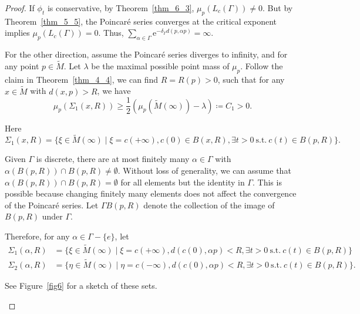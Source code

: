 \documentclass[reqno,11pt]{article}
\theoremstyle{definition}
\theoremstyle{remark}
\numberwithin{equation}{section}
\begin{document}
\begin{proof}
	If $\phi_t$ is conservative, by Theorem~\ref{thm_6_3}, $\mu_p(L_c(\Gamma))\neq 0$. But by Theorem~\ref{thm_5_5}, the Poincar\'e series converges at the critical exponent implies $\mu_p(L_c(\Gamma))=0$. Thus, $\sum_{\alpha\in\Gamma}\mathrm{e}^{-\delta_\Gamma d(p,\alpha p)}=\infty$.

	For the other direction, assume the Poincar\'e series diverges to infinity, and for any point $p\in\widetilde{M}$. Let $\lambda$ be the maximal possible point mass of $\mu_p$. Follow the claim in Theorem~\ref{thm_4_4}, we can find $R=R(p)>0$, such that for any $x\in\widetilde{M}$ with $d(x,p)>R$, we have
	\begin{displaymath}
		\mu_p(\Sigma_1(x,R))\geq\frac{1}{2}(\mu_p(\widetilde{M}(\infty))-\lambda)\coloneqq C_1>0.
	\end{displaymath}

	Here
	\begin{displaymath}
		\Sigma_1(x,R)=\{\xi\in\widetilde{M}(\infty)\mid\xi=c(+\infty), c(0)\in B(x,R), \exists t>0~\text{s.t.}~c(t)\in B(p,R)\}.
	\end{displaymath}

	Given $\Gamma$ is discrete, there are at most finitely many $\alpha\in\Gamma$ with $\alpha(B(p,R))\cap B(p,R)\neq\emptyset$. Without loss of generality, we can assume that $\alpha(B(p,R))\cap B(p,R)=\emptyset$ for all elements but the identity in $\Gamma$. This is possible because changing finitely many elements does not affect the convergence of the Poincar\'e series. Let $\Gamma B(p,R)$ denote the collection of the image of $B(p,R)$ under $\Gamma$.

	Therefore, for any $\alpha\in\Gamma-\{e\}$, let
	\begin{displaymath}
		\begin{aligned}
			\Sigma_1(\alpha,R) & =\{\xi\in\widetilde{M}(\infty)\mid\xi=c(+\infty), d(c(0),\alpha p)<R, \exists t>0~\text{s.t.}~c(t)\in B(p,R)\}    \\
			\Sigma_2(\alpha,R) & =\{\eta\in\widetilde{M}(\infty)\mid\eta=c(-\infty), d(c(0),\alpha p)<R, \exists t>0~\text{s.t.}~c(t)\in B(p,R)\}.
		\end{aligned}
	\end{displaymath}

	See Figure~\ref{fig6} for a sketch of these sets.

	\begin{figure}[htbp]
		\centering
\end{figure}
\end{proof}
\end{document}
